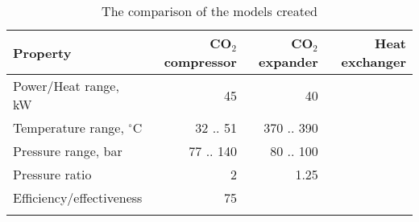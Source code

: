 \begin{table}
\label{tab:DiscussionComparison}
\caption{The comparison of the models created}
\begin{center}
\begin{tabulary}{0.9\textwidth}{LRRR}
\toprule
Property    	                &	CO$_2$ compressor   & CO$_2$	expander    & Heat exchanger    \\
\midrule
Power/Heat range, kW            &       45              &       40              &                   \\
Temperature range, $^\circ$C    &    32 .. 51           &      370 .. 390     &                   \\
Pressure range, bar             &   77 .. 140           &     80 .. 100         &                   \\
Pressure ratio                  &   2                   &        1.25           &                   \\
Efficiency/effectiveness        &      75               &                       &                   \\
& & & \\
\bottomrule
\end{tabulary}
\end{center}
\end{table}